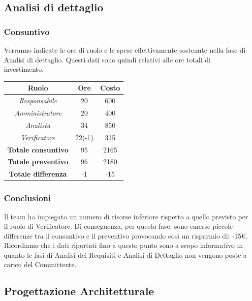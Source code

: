 \subsection{Analisi di dettaglio}

\subsubsection{Consuntivo}

Verranno indicate le ore di ruolo e le spese effettivamente sostenute nella fase di Analisi di dettaglio. Questi dati sono quindi relativi alle ore totali di investimento.

\begin{center}
	\centering
	\begin{tabular}{|c|c|c|}
		\hline
		\textbf{Ruolo} & \textbf{Ore} & \textbf{Costo} \\
		\hline
		\emph{Responsabile}  & 20 & 600 \\
		\hline  \emph{Amministratore}  & 20 & 400 \\
		\hline  \emph{Analista}  &  34 &850  \\
		\hline  \emph{Verificatore} & 22(-1)  &315  \\
		\hline
		\textbf{Totale consuntivo} &  95 & 2165  \\
		\hline
		\textbf{Totale preventivo} &  96&  2180\\
		\hline
		\textbf{Totale differenza} & -1 & -15 \\
		\hline
	\end{tabular}
	
\end{center}

\subsubsection{Conclusioni}

Il team ha impiegato un numero di risorse inferiore rispetto a quello previsto per il ruolo di Verificatore. Di conseguenza, per questa fase, sono emerse piccole differenze tra il consuntivo e il preventivo provocando così un risparmio di: -15€.
Ricordiamo che i dati riportati fino a questo punto sono a scopo informativo in quanto
le fasi di Analisi dei Requisiti e Analisi di Dettaglio non vengono poste a carico del Committente.


\subsection{Progettazione Architetturale}


